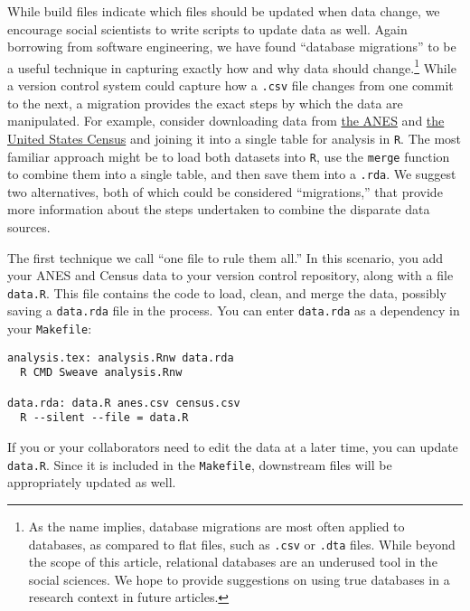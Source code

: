 \documentclass[]{article}
\begin{document}
While build files indicate which files should be updated when data change, we
encourage social scientists to write scripts to update data as well. Again
borrowing from software engineering, we have found ``database migrations'' to
be a useful technique in capturing exactly how and why data should
change.\footnote{As the name implies, database migrations are most often
applied to databases, as compared to flat files, such as \texttt{.csv} or
\texttt{.dta} files. While beyond the scope of this article, relational databases 
are an
underused tool in the social sciences. We hope to provide suggestions on using
true databases in a research context in future articles.}
While a version control system could capture how a \texttt{.csv} file changes
from one commit to the next, a migration provides the exact steps by which the
data are manipulated. For example, consider downloading data from \href{http://
electionstudies.org}{the
ANES} and \href{http://www.census.gov}{the United States
Census} and joining it into a single table for analysis
in \texttt{R}. The most familiar approach might be to load both datasets into
\texttt{R}, use the \texttt{merge} function to combine them into a single
table, and then save them into a \texttt{.rda}. We suggest two alternatives,
both of which could be considered ``migrations,'' that provide more
information about the steps undertaken to combine the disparate data sources.

The first technique we call ``one file to rule them all.'' In this scenario,
you add your ANES and Census data to your version control repository, along
with a file \texttt{data.R}. This file contains the code to load, clean, and
merge the data, possibly saving a \texttt{data.rda} file in the process. You can
enter \texttt{data.rda} as a dependency in your \texttt{Makefile}:

\begin{verbatim}
analysis.tex: analysis.Rnw data.rda
  R CMD Sweave analysis.Rnw

data.rda: data.R anes.csv census.csv
  R --silent --file = data.R
\end{verbatim}

If you or your collaborators need to edit the data at a later time, you can
update \texttt{data.R}. Since it is included in the \texttt{Makefile},
downstream files will be appropriately updated as well.
\end{document}
